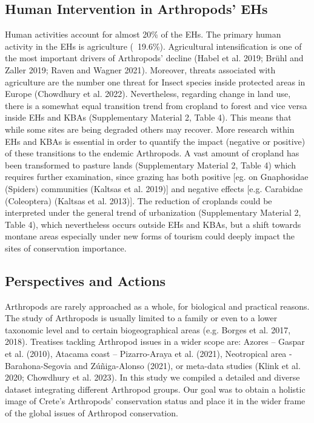     \subsection{Human Intervention in Arthropods’ EHs}
    \label{subsec:arthropods-human-intervention-ehs}
Human activities account for almost 20\% of the EHs. The primary human activity
in the EHs is agriculture (~19.6\%). Agricultural intensification is one of the
most important drivers of Arthropods’ decline (Habel et al. 2019; Brühl and Zaller 2019; Raven and Wagner 2021).
Moreover, threats associated with agriculture are the number one threat for
Insect species inside protected areas in Europe (Chowdhury et al. 2022).
Nevertheless, regarding change in land use, there is a somewhat equal
transition trend from cropland to forest and vice versa inside EHs and KBAs
(Supplementary Material 2, Table 4). This means that while some sites are being
degraded others may recover. More research within EHs and KBAs is essential in
order to quantify the impact (negative or positive) of these transitions to the
endemic Arthropods. A vast amount of cropland has been transformed to pasture
lands (Supplementary Material 2, Table 4) which requires further examination,
since grazing has both positive [eg. on Gnaphosidae (Spiders) communities (Kaltsas et al.  2019)]
and negative effects [e.g. Carabidae (Coleoptera) (Kaltsas et al. 2013)].
The reduction of croplands could be interpreted under the general trend of
urbanization (Supplementary Material 2, Table 4), which nevertheless occurs
outside EHs and KBAs, but a shift towards montane areas especially under new
forms of tourism could deeply impact the sites of conservation importance.
    
    \subsection{Perspectives and Actions}
    \label{subsec:arthropods-perspectives-actions}

Arthropods are rarely approached as a whole, for biological and practical
reasons. The study of Arthropods is usually limited to a family or even to a
lower taxonomic level and to certain biogeographical areas (e.g. Borges et al. 2017, 2018).
Treatises tackling Arthropod issues in a wider scope are: Azores – Gaspar et al. (2010),
Atacama coast – Pizarro-Araya et al. (2021), Neotropical area - Barahona-Segovia and Zúñiga-Alonso (2021),
or meta-data studies (Klink et al. 2020; Chowdhury et al. 2023). In this study
we compiled a detailed and diverse dataset integrating different Arthropod groups.
Our goal was to obtain a holistic image of Crete’s Arthropods’ conservation
status and place it in the wider frame of the global issues of Arthropod conservation.

